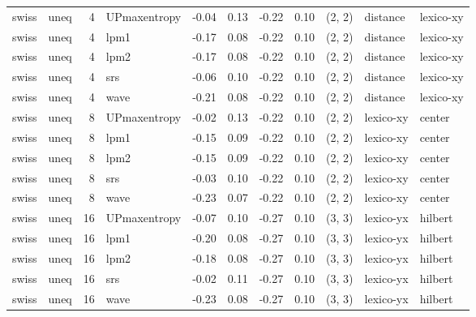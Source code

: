 \begin{tabular}{llrlrrrrlll}
 swiss &  uneq &  4 & UPmaxentropy & -0.04 &     0.13 &  -0.22 &       0.10 & (2, 2) &  distance &  lexico-xy \\
 swiss &  uneq &  4 &         lpm1 & -0.17 &     0.08 &  -0.22 &       0.10 & (2, 2) &  distance &  lexico-xy \\
 swiss &  uneq &  4 &         lpm2 & -0.17 &     0.08 &  -0.22 &       0.10 & (2, 2) &  distance &  lexico-xy \\
 swiss &  uneq &  4 &          srs & -0.06 &     0.10 &  -0.22 &       0.10 & (2, 2) &  distance &  lexico-xy \\
 swiss &  uneq &  4 &         wave & -0.21 &     0.08 &  -0.22 &       0.10 & (2, 2) &  distance &  lexico-xy \\
 swiss &  uneq &  8 & UPmaxentropy & -0.02 &     0.13 &  -0.22 &       0.10 & (2, 2) &   lexico-xy &     center \\
 swiss &  uneq &  8 &         lpm1 & -0.15 &     0.09 &  -0.22 &       0.10 & (2, 2) &   lexico-xy &     center \\
 swiss &  uneq &  8 &         lpm2 & -0.15 &     0.09 &  -0.22 &       0.10 & (2, 2) &   lexico-xy &     center \\
 swiss &  uneq &  8 &          srs & -0.03 &     0.10 &  -0.22 &       0.10 & (2, 2) &   lexico-xy &     center \\
 swiss &  uneq &  8 &         wave & -0.23 &     0.07 &  -0.22 &       0.10 & (2, 2) &   lexico-xy &     center \\
 swiss &  uneq & 16 & UPmaxentropy & -0.07 &     0.10 &  -0.27 &       0.10 & (3, 3) &   lexico-yx &    hilbert \\
 swiss &  uneq & 16 &         lpm1 & -0.20 &     0.08 &  -0.27 &       0.10 & (3, 3) &   lexico-yx &    hilbert \\
 swiss &  uneq & 16 &         lpm2 & -0.18 &     0.08 &  -0.27 &       0.10 & (3, 3) &   lexico-yx &    hilbert \\
 swiss &  uneq & 16 &          srs & -0.02 &     0.11 &  -0.27 &       0.10 & (3, 3) &   lexico-yx &    hilbert \\
 swiss &  uneq & 16 &         wave & -0.23 &     0.08 &  -0.27 &       0.10 & (3, 3) &   lexico-yx &    hilbert \\
\bottomrule
\end{tabular}
